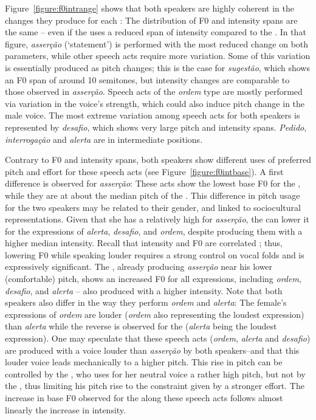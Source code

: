 \documentclass[output=paper]{LSP/langsci}
\begin{document}
Figure~\ref{figure:f0intrange} shows that both speakers are highly coherent in the  changes they produce for each : The distribution of F0 and intensity spans are the same -- even if the  uses a reduced span of intensity compared to the . 
In that figure, \textit{asserção} (`statement') is performed with the most reduced  change on both parameters, while other speech acts require more variation. 
Some of this variation is essentially produced as pitch changes; this is the case for \textit{sugestão}, which shows an F0 span of around 10 semitones, but intensity changes are comparable to those observed in \textit{asserção}. 
Speech acts of the \textit{ordem} type are mostly performed via variation in the voice's strength, which could also induce pitch change in the male voice. 
The most extreme variation among speech acts for both speakers is represented by
\textit{desafio}, which shows very large pitch and intensity spans. 
\textit{Pedido}, \textit{interrogação} and \textit{alerta} are in intermediate positions.


Contrary to F0 and intensity spans, both speakers show different uses of preferred pitch and effort for these speech acts (see Figure~\ref{figure:f0intbase}). 
A first difference is observed for \textit{asserção}: These acts show the lowest base F0 for the , while they are at about the median pitch of the . 
This difference in pitch usage for the two speakers may be related to their gender, and linked to sociocultural representations. 
Given that she has a relatively high  for \textit{asserção}, the  can lower it for the expressions of \textit{alerta}, \textit{desafio}, and \textit{ordem}, despite producing them with a higher median intensity. 
Recall that intensity and F0 are correlated \citep{Titze1992,Lienard1999,Traunmuller2000}; thus, lowering F0 while speaking louder requires a strong control on vocal folds and is expressively significant. 
The , already producing \textit{asserção} near his lower (comfortable) pitch, shows an increased F0 for all expressions, including \textit{ordem}, \textit{desafio}, and \textit{alerta} -- also produced with a higher intensity. 
Note that both speakers also differ in the way they perform \textit{ordem} and \textit{alerta}: The female's expressions of \textit{ordem} are louder (\textit{ordem} also representing the loudest expression) than \textit{alerta} while the reverse is observed for the  (\textit{alerta} being the loudest expression).
One may speculate that these speech acts (\textit{ordem}, \textit{alerta} and \textit{desafio}) are produced with a voice louder than \textit{asserção} by both speakers--and that this louder voice leads mechanically to a higher pitch. 
This rise in pitch can be controlled by the , who uses for her neutral voice a rather high pitch, but not by the , thus limiting his pitch rise to the constraint given by a stronger effort. 
The increase in base F0 observed for the  along these speech acts follows almost linearly the increase in intensity.\pagebreak
\end{document}
